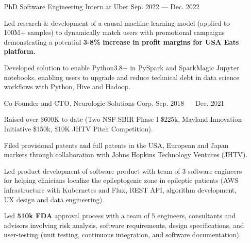 \begin{cventries}
    \cvproject
    {PhD Software Engineering Intern at Uber} %
    {Sep. 2022 --- Dec. 2022} %
    {
      \begin{cvitems} %
        \item{Led research \& development of a causal machine learning model (applied to 100M+ samples) to dynamically match users with promotional campaigns demonstrating a potential \textbf{3-8\% increase in profit margins for USA Eats platform.}}
        \item{Developed solution to enable Python3.8+ in PySpark and SparkMagic Jupyter notebooks, enabling users to upgrade and reduce  technical debt in data science workflows with Python, Hive and Hadoop.}
      \end{cvitems}
    }
    \newline
    
    \cvproject
    {Co-Founder and CTO, Neurologic Solutions Corp.} %
    {Sep. 2018 --- Dec. 2021} %
    {
      \begin{cvitems} %
        \item{Raised over \$600K to-date (Two NSF SBIR Phase I \$225k, Mayland Innovation Initiative \$150k, \$10K JHTV Pitch Competition).}
        \item{Filed provisional patents and full patents in the USA, European and Japan markets through collaboration with Johns Hopkins Technology Ventures (JHTV).}
        \item{Led product development of software product with team of 3 software engineers for helping clinicians localize the epileptogenic zone in epileptic patients (AWS infrastructure with Kubernetes and Flux, REST API, algorithm development, UX design and data engineering).}
        \item{Led \textbf{510k FDA} approval process with a team of 5 engineers, consultants and advisors involving risk analysis, software requirements, design specifications, and user-testing (unit testing, continuous integration, and software documentation).}
      \end{cvitems}
    }
    \newline


\end{cventries}

